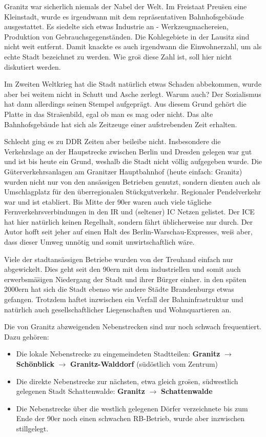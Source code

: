 Granitz war sicherlich niemals der Nabel der Welt.
Im Freistaat Preu\"sen eine Kleinstadt, wurde es irgendwann mit dem repr\"asentativen Bahnhofsgeb\"aude ausgestattet.
Es siedelte sich etwas Industrie an - Werkzeugmachereien, Produktion von Gebrauchsgegenst\"anden.
Die Kohlegebiete in der Lausitz sind nicht weit entfernt.
Damit knackte es auch irgendwann die Einwohnerzahl, um als echte Stadt bezeichnet zu werden.
Wie gro\"s diese Zahl ist, soll hier nicht diskutiert werden.

Im Zweiten Weltkrieg hat die Stadt nat\"urlich etwas Schaden abbekommen, wurde aber bei weitem nicht in Schutt und Asche zerlegt.
Warum auch?
Der Sozialismus hat dann allerdings seinen Stempel aufgepr\"agt.
Aus diesem Grund geh\"ort die Platte in das Stra\"senbild, egal ob man es mag oder nicht.
Das alte Bahnhofsgeb\"aude hat sich als Zeitzeuge einer aufstrebenden Zeit erhalten.

Schlecht ging es zu DDR Zeiten aber beileibe nicht.
Insbesondere die Verkehrslage an der Haupstrecke zwischen Berlin und Dresden gelegen war gut und ist bis heute ein Grund, weshalb die Stadt nicht v\"ollig aufgegeben wurde.
Die G\"uterverkehrsanlagen am Granitzer Hauptbahnhof (heute einfach: Granitz) wurden nicht nur von den ans\"assigen Betrieben genutzt, sondern dienten auch als Umschlagplatz f\"ur den \"uberregionalen St\"uckgutverkehr.
Regionaler Pendelverkehr war und ist etabliert.
Bis Mitte der 90er waren auch viele t\"agliche Fernverkehrsverbindungen in den IR und (seltener) IC Netzen gelistet.
Der ICE hat hier nat\"urlich keinen Regelhalt, sondern f\"ahrt \"ublicherweise nur durch.
Der Autor hofft seit jeher auf einen Halt des Berlin-Warschau-Expresses, wei\"s aber, dass dieser Umweg unn\"otig und somit unwirtschaftlich w\"are.

Viele der stadtans\"assigen Betriebe wurden von der Treuhand einfach nur abgewickelt.
Dies geht seit den 90ern mit dem industriellen und somit auch erwerbsm\"a\"sigen Niedergang der Stadt und ihrer B\"urger einher.
in den sp\"aten 2000ern hat sich die Stadt ebenso wie andere St\"adte Brandenburgs etwas gefangen.
Trotzdem haftet inzwischen ein Verfall der Bahninfrastruktur und nat\"urlich auch gesellschaftlicher Liegenschaften und Wohnquartieren an.

Die von Granitz abzweigenden Nebenstrecken sind nur noch schwach frequentiert.
Dazu geh\"oren:
\begin{itemize}
	\item Die lokale Nebenstrecke zu eingemeindeten Stadtteilen: \textbf{Granitz} $\rightarrow$ \textbf{Sch\"onblick} $\rightarrow$ \textbf{Granitz-Walddorf} (s\"ud\"ostlich vom Zentrum)
	\item Die direkte Nebenstrecke zur n\"achsten, etwa gleich gro\"sen, s\"udwestlich gelegenen Stadt Schattenwalde: \textbf{Granitz} $\rightarrow$ \textbf{Schattenwalde}
	\item Die Nebenstrecke \"uber die westlich gelegenen D\"orfer verzeichnete bis zum Ende der 90er noch einen schwachen RB-Betrieb, wurde aber inzwischen stillgelegt.
\end{itemize}